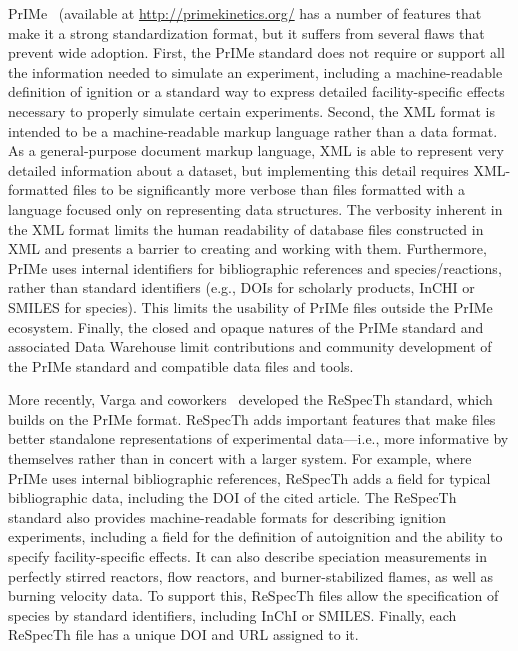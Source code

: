 \documentclass[12pt]{ijck}
\begin{document}
PrIMe~\autocite{Frenklach:2007bm,You:2011hy} (available at \url{http://primekinetics.org/}
has a number of features that make
it a strong standardization format, but it suffers from several flaws that
prevent wide adoption. First, the PrIMe standard does not require or support all
the information needed to simulate an experiment, including a machine-readable
definition of ignition or a standard way to express detailed facility-specific
effects necessary to properly simulate certain experiments. Second, the XML
format is intended to be a machine-readable markup language rather than a data format.
As a general-purpose document markup language, XML is able to represent very detailed
information about a dataset, but implementing this detail requires XML-formatted
files to be significantly more verbose than files formatted with a language focused
only on representing data structures. The verbosity inherent in the XML format
limits the human readability of database files constructed in XML and presents a barrier to
creating and working with them. Furthermore, PrIMe uses
internal identifiers for bibliographic references and
species\slash reactions, rather than standard identifiers (e.g., DOIs for
scholarly products, InCHI or SMILES for species). This limits the usability of PrIMe files outside
the PrIMe ecosystem. Finally, the closed and opaque natures of the PrIMe standard
and associated Data Warehouse limit contributions and community development of
the PrIMe standard and compatible data files and tools.

More recently, Varga and coworkers~\autocite{Varga2015a,Varga2017} developed the
ReSpecTh standard, which builds on the PrIMe format. ReSpecTh adds important
features that make files better standalone representations of experimental
data---i.e., more informative by themselves rather than in concert with a larger
system. For example, where PrIMe uses internal bibliographic references,
ReSpecTh adds a field for typical bibliographic data, including the DOI of
the cited article. The ReSpecTh standard also
provides machine-readable formats for describing ignition experiments, including
a field for the definition of autoignition and the ability to specify
facility-specific effects. It can also describe speciation measurements in
perfectly stirred reactors, flow reactors, and burner-stabilized flames, as well as
burning velocity data. To support this, ReSpecTh files allow the specification of species by
standard identifiers, including InChI or SMILES. Finally, each ReSpecTh file
has a unique DOI and URL assigned to it.
\end{document}
